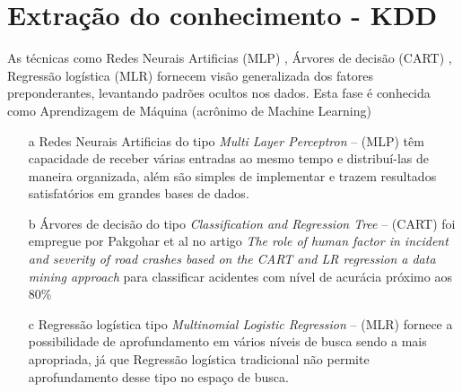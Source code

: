 \section{Extração do conhecimento - KDD}

As técnicas como Redes Neurais Artificias (MLP) \cite{DecisaoCredito}, Árvores de decisão (CART) \cite{DataMining}, Regressão logística (MLR) 
\cite{RegrecaoLog} fornecem visão generalizada dos fatores preponderantes, levantando padrões ocultos nos dados. Esta fase é conhecida como 
Aprendizagem de Máquina (acrônimo de Machine Learning)

\begin{itemize}
 \item[a] Redes Neurais Artificias do tipo \textit{ Multi Layer Perceptron}  -- (MLP) têm capacidade de receber várias entradas ao mesmo tempo e distribuí-las de maneira organizada, além 
	  são simples de implementar e trazem resultados satisfatórios em grandes bases de dados.
 
 \item[b] Árvores de decisão do tipo \textit{ Classification and Regression Tree}  -- (CART) foi empregue por Pakgohar et al no artigo 
	  \textit{The role of human factor in incident and severity of road crashes based on the CART and LR regression a data mining approach}  para classificar acidentes 
	  com nível de acurácia próximo aos 80\%

 \item[c] Regressão logística tipo \textit{Multinomial Logistic Regression} -- (MLR) fornece a possibilidade de aprofundamento em vários níveis de busca sendo a mais apropriada, já que Regressão logística 
	  tradicional não permite aprofundamento desse tipo no espaço de busca.
\end{itemize}


